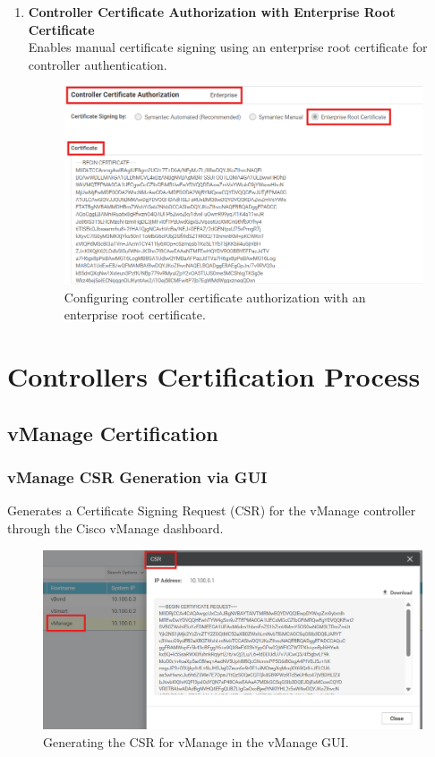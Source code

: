 \documentclass[12pt,english]{report}
\begin{document}
\begin{enumerate}
    \item \textbf{Controller Certificate Authorization with Enterprise Root Certificate} \\
    Enables manual certificate signing using an enterprise root certificate for controller authentication.
    \begin{figure}[h]
        \centering
        \includegraphics[width=1\textwidth]{appendix/vmanage-settings2.png}
        \caption{Configuring controller certificate authorization with an enterprise root certificate.}
        \label{fig:controller-cert-auth}
    \end{figure}
\end{enumerate}

\newpage
\section{Controllers Certification Process}

\subsection{vManage Certification}

\subsubsection{vManage CSR Generation via GUI}

Generates a Certificate Signing Request (CSR) for the vManage controller through the Cisco vManage dashboard.

\begin{figure}[H]
    \centering
    \includegraphics[width=1\textwidth]{appendix/vmanage-csr.png}
    \caption{Generating the CSR for vManage in the vManage GUI.}
    \label{fig:vmanage-csr}
\end{figure}
\end{document}
